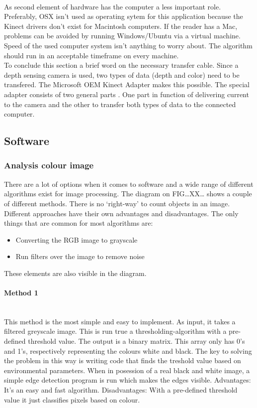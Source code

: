 \documentclass[11pt]{article}
\begin{document}
\\ As second element of hardware has the computer a less important role. Preferably, OSX isn't used as operating sytem for this application because the Kinect drivers don't exist for Macintosh computers. If the reader has a Mac, problems can be avoided by running Windows/Ubuntu via a virtual machine. Speed of the used computer system isn't anything to worry about. The algorithm should run in an acceptable timeframe on every machine.\\ To conclude this section a brief word on the necessary transfer cable. Since a depth sensing camera is used, two types of data (depth and color) need to be transfered. The Microsoft OEM Kinect Adapter makes this possible. The special adapter consists of two general parts . One part in function of delivering current to the camera and the other to transfer both types of data to the connected computer. 

\subsection{Software}
\subsubsection{Analysis colour image }
There are a lot of options when it comes to software and a wide range of different algorithms exist for image processing. The diagram on FIG…XX… shows a couple of different methods. There is no ‘right-way’ to count objects in an image. Different approaches have their own advantages and disadvantages. The only things that are common for most algorithms are:
\begin{itemize}
\item Converting the RGB image to grayscale
\item Run filters over the image to remove noise
\end{itemize}
These elements are also visible in the diagram.
\paragraph{Method 1}\mbox{}\\
This method is the most simple and easy to implement. As input, it takes a filtered greyscale image. This is run true a thresholding-algorithm with a pre-defined threshold value. The output is a binary matrix. This array only has 0's and 1's, respectively representing the colours white and black. The key to solving the problem in this way is writing code that finds the treshold value based on environmental parameters. When in posession of a real black and white image, a simple edge detection program is run which makes the edges visible. 
Advantages: It’s an easy and fast algorithm.
Disadvantages: With a pre-defined threshold value it just classifies pixels based on colour. 
\end{document}
